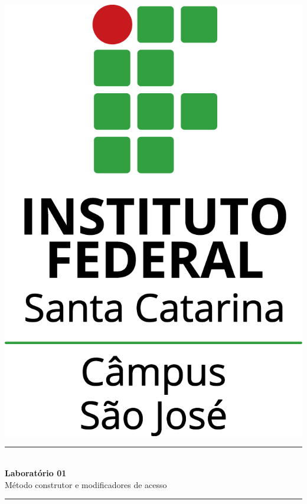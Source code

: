 \documentclass[11pt]{../../classes/ifscarticle}
\begin{document}
\begin{titlepage}
\begin{center}
\includegraphics[scale=.7]{../../classes/imagens/ifsc-v}
\vspace{4cm}

\rule{\linewidth}{0.5pt} \\[6pt] 

{\huge \bfseries Laboratório 01}\\[3pt] 

{\large  Método construtor e modificadores de acesso}\\

\rule{\linewidth}{2pt}  \\[10pt]
\vspace{1cm}
\end{center}


\end{titlepage}
\end{document}
